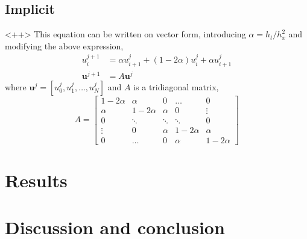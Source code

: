 \documentclass[a4paper,11pt]{article}
\begin{document}
\subsection{Implicit}<++>
This equation can be written on vector form, introducing $\alpha = h_t / h_x^2$ and modifying the above expression,
\begin{align*}
    u^{j+1}_i   &= \alpha u^j_{i+1} + \left( 1 - 2\alpha \right) u^j_{i} + \alpha u^j_{i+1} \\
    \mathbf{u}^{j+1} &= A \mathbf{u}^j
\end{align*}
where $\mathbf{u}^j = [u^j_0, u^j_1, \dots, u^j_N]$ and $A$ is a tridiagonal matrix,
\[ A = 
    \begin{bmatrix}
        1-2\alpha   & \alpha & 0        & \dots     & 0 \\
        \alpha      & 1-2\alpha& \alpha & 0         & \vdots \\
        0           & \ddots & \ddots   & \ddots    & 0  \\
        \vdots      & 0      & \alpha   & 1-2\alpha & \alpha \\
        0           & \dots  & 0        & \alpha    & 1-2\alpha
    \end{bmatrix}
\]

\section{Results}
\section{Discussion and conclusion}




\end{document}
